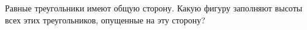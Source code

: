 Равные треугольники имеют общую сторону. Какую фигуру заполняют высоты всех этих треугольников, опущенные на эту сторону?